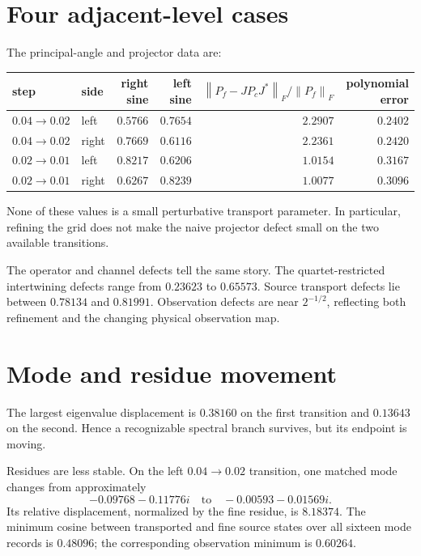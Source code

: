 \documentclass[12pt]{article}
\theoremstyle{remark}
\newcommand{\norm}[1]{\left\lVert#1\right\rVert}
\begin{document}
\section{Four adjacent-level cases}

The principal-angle and projector data are:
\begin{center}
\small
\begin{tabular}{llrrrr}
\toprule
step & side & right sine & left sine & $\norm{P_f-JP_cJ^*}_F/\norm{P_f}_F$ & polynomial error\\
\midrule
$0.04\to0.02$ & left  & $0.5766$ & $0.7654$ & $2.2907$ & $0.2402$\\
$0.04\to0.02$ & right & $0.7669$ & $0.6116$ & $2.2361$ & $0.2420$\\
$0.02\to0.01$ & left  & $0.8217$ & $0.6206$ & $1.0154$ & $0.3167$\\
$0.02\to0.01$ & right & $0.6267$ & $0.8239$ & $1.0077$ & $0.3096$\\
\bottomrule
\end{tabular}
\end{center}
None of these values is a small perturbative transport parameter.  In
particular, refining the grid does not make the naive projector defect small
on the two available transitions.

The operator and channel defects tell the same story.  The quartet-restricted
intertwining defects range from $0.23623$ to $0.65573$.  Source transport
defects lie between $0.78134$ and $0.81991$.  Observation defects are near
$2^{-1/2}$, reflecting both refinement and the changing physical
observation map.

\section{Mode and residue movement}

The largest eigenvalue displacement is $0.38160$ on the first transition and
$0.13643$ on the second.  Hence a recognizable spectral branch survives,
but its endpoint is moving.

Residues are less stable.  On the left $0.04\to0.02$ transition, one matched
mode changes from approximately
\begin{equation*}
 -0.09768-0.11776i
 \quad\text{to}\quad
 -0.00593-0.01569i.
\end{equation*}
Its relative displacement, normalized by the fine residue, is $8.18374$.
The minimum cosine between transported and fine source states over all
sixteen mode records is $0.48096$; the corresponding observation minimum is
$0.60264$.
\end{document}
